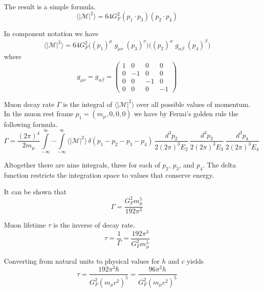 \documentclass[12pt]{article}
\begin{document}
\noindent
The result is a simple formula.
\begin{equation*}
\langle|\mathcal{M}|^2\rangle=64G_F^2(p_1\cdot p_3)(p_2\cdot p_4)
\tag{1}
\end{equation*}

\noindent
In component notation we have
\begin{equation*}
\langle|\mathcal{M}|^2\rangle=64G_F^2
\bigg((p_1)^\mu \; g_{\mu\nu}\; (p_3)^\nu\bigg)
\bigg((p_2)^\alpha \; g_{\alpha\beta} \; (p_4)^\beta\bigg)
\end{equation*}
where
\begin{equation*}
g_{\mu\nu}=g_{\alpha\beta}=\begin{pmatrix}
1 & 0 & 0 & 0\\
0 & -1 & 0 & 0\\
0 & 0 & -1 & 0\\
0 & 0 & 0 & -1
\end{pmatrix}
\end{equation*}

\noindent
Muon decay rate $\Gamma$ is the integral of $\langle|\mathcal{M}|^2\rangle$
over all possible values of momentum.
In the muon rest frame $p_1=(m_\mu,0,0,0)$ we have by Fermi's golden rule the following formula.
\begin{equation*}
\Gamma=\frac{(2\pi)^4}{2m_\mu}
\int\limits_{-\infty}^\infty \cdots \int\limits_{-\infty}^\infty
\langle|\mathcal{M}|^2\rangle
\,\delta(p_1-p_2-p_3-p_4)
\,\frac{d^3p_2}{2(2\pi)^3E_2}\,\frac{d^3p_3}{2(2\pi)^3E_3}\,\frac{d^3p_4}{2(2\pi)^3E_4}
\end{equation*}

\noindent
Altogether there are nine integrals, three for each of $p_2$, $p_3$, and $p_4$.
The delta function restricts the integration space to values that conserve energy.

\bigskip
\noindent
It can be shown that
\begin{equation*}
\Gamma=\frac{G_F^2 m_\mu^5}{192\pi^3}
\end{equation*}

\noindent
Muon lifetime $\tau$ is the inverse of decay rate.
\begin{equation*}
\tau=\frac{1}{\Gamma}=\frac{192\pi^3}{G_F^2 m_\mu^5}
\end{equation*}

\noindent
Converting from natural units to physical values for $h$ and $c$ yields
\begin{equation*}
\tau
=\frac{192\pi^3\hbar}{G_F^2\left(m_\mu c^2\right)^5}
=\frac{96\pi^2h}{G_F^2\left(m_\mu c^2\right)^5}
\end{equation*}
\end{document}
